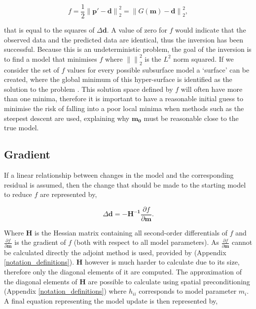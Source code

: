 \begin{equation}
f = \frac{1}{2} \left \| \textbf{p} \prime- \textbf{d} \right \|_{2}^{2} = \left \| G(\textbf{m})- \textbf{d} \right \|_{2}^{2}, 
\label{objective_function}
\end{equation}

that is equal to the squares of $ \Delta \textbf{d}$. A value of zero for $f$ would indicate that the observed data and the predicted data are identical, thus the inversion has been successful. Because this is an undeterministic problem, the goal of the inversion is to find a model that minimises $f$ where $\left \| \right \|_{2}^{2}$ is the $L^{2}$ norm squared. If we consider the set of $f$ values for every possible subsurface model a `surface' can be created, where the global minimum of this hyper-surface is identified as the solution to the problem \citep{han2014seismic}. This solution space defined by $f$ will often have more than one minima, therefore it is important to have a reasonable initial guess to minimise the risk of falling into a poor local minima when methods such as the steepest descent are used, explaining why $\mathbf{m_{0}}$ must be reasonable close to the true model. 

\subsection{Gradient}
If a linear relationship between changes in the model and the corresponding residual is assumed, then the change that should be made to the starting model to reduce $f$ are represented by,

\begin{equation}
\Delta \textbf{d} = - \mathbf{H^{-1}}\frac{\partial f}{\partial \mathbf{m}}. 
\label{hessian}
\end{equation}

Where $\mathbf{H}$ is the Hessian matrix containing all second-order differentials of $f$ and 
$\frac{\partial f}{\partial \mathbf{m}}$ is the gradient of $f$ (both with respect to all model parameters). As $\frac{\partial f}{\partial \mathbf{m}}$ cannot be calculated directly the adjoint method is used, provided by \citet{tarantola1984inversion} (Appendix \ref{notation_definitions}). $\mathbf{H}$ however is much harder to calculate due to its size, therefore only the diagonal elements of it are computed. The approximation of the diagonal elements of $\textbf{H}$ are possible to calculate using spatial preconditioning (Appendix \ref{notation_definitions}) where ${h_{ii}}$ corresponds to model parameter $m_{i}$. A final equation representing the model update is then represented by, 


